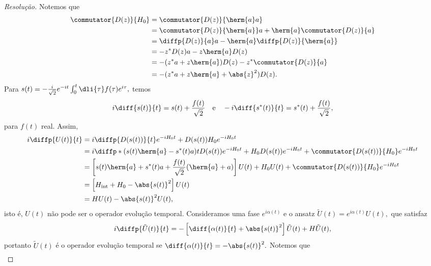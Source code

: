 \begin{proof}[Resolução]
   Notemos que
   \begin{align*}
      \commutator{D(z)}{H_0} &= \commutator{D(z)}{\herm{a}a}\\
                             &= \commutator{D(z)}{\herm{a}}a + \herm{a}\commutator{D(z)}{a}\\
                             &= \diffp{D(z)}{a}a - \herm{a} \diffp{D(z)}{\herm{a}}\\
                             &= -z^*D(z) a - z\herm{a} D(z)\\
                             &= -(z^* a + z \herm{a}) D(z) - z^* \commutator{D(z)}{a}\\
                             &= -(z^*a + z \herm{a} + \abs{z}^2) D(z).
   \end{align*}
   Para \(s(t) = - \frac{i}{\sqrt{2}} e^{-it} \int_0^t \dli{\tau} f(\tau) e^{i \tau},\) temos
   \begin{equation*}
      i\diff{s(t)}{t} = s(t) + \frac{f(t)}{\sqrt{2}}\quad\text{e}\quad -i \diff{s^*(t)}{t} = s^*(t) + \frac{f(t)}{\sqrt{2}},
   \end{equation*}
   para \(f(t)\) real. Assim,
   \begin{align*}
      i\diffp{U(t)}{t} &= i\diffp{D(s(t))}{t} e^{-i H_0 t} + D(s(t)) H_0e^{-i H_0t}\\
                    &= i \diffp*{\left(s(t) \herm{a} - s^*(t) a\right)}{t} D(s(t)) e^{-iH_0t} + H_0 D(s(t))e^{-iH_0 t} + \commutator{D(s(t))}{H_0} e^{-iH_0 t}\\
                    &= \left[s(t) \herm{a} + s^*(t) a + \frac{f(t)}{\sqrt{2}}(\herm{a} + a)\right]U(t) + H_0 U(t) + \commutator{D(s(t))}{H_0} e^{-iH_0t}\\
                    &= \left[H_\mathrm{int} + H_0 - \abs{s(t)}^2\right] U(t)\\
                    &= H U(t) - \abs{s(t)}^2 U(t),
   \end{align*}
   isto é, \(U(t)\) não pode ser o operador evolução temporal. Consideramos uma fase \(e^{i\alpha(t)}\) e o ansatz \(\tilde{U}(t) = e^{i \alpha(t)} U(t),\) que satisfaz
   \begin{equation*}
      i\diffp{\tilde{U}(t)}{t} = - \left[\diff{\alpha(t)}{t} + \abs{s(t)}^2\right] \tilde{U}(t) + H \tilde{U}(t),
   \end{equation*}
   portanto \(\tilde{U}(t)\) é o operador evolução temporal se \(\diff{\alpha(t)}{t} = - \abs{s(t)}^2.\) Notemos que
   \begin{align*}

\end{align*}
\end{proof}
